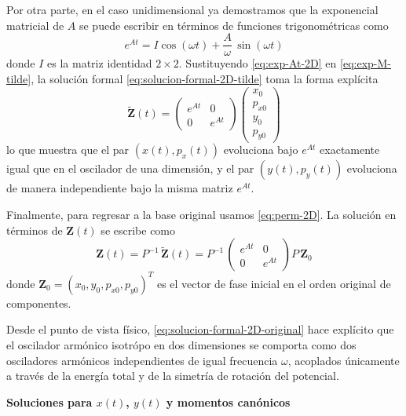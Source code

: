 \documentclass{article}
\begin{document}
Por otra parte, en el caso unidimensional ya demostramos que la exponencial
matricial de $A$ se puede escribir en términos de funciones trigonométricas como
\begin{equation}
e^{At} = I\cos(\omega t) + \frac{A}{\omega}\,\sin(\omega t)
\label{eq:exp-At-2D}
\end{equation}
donde $I$ es la matriz identidad $2\times 2$. Sustituyendo
\eqref{eq:exp-At-2D} en \eqref{eq:exp-M-tilde}, la solución formal
\eqref{eq:solucion-formal-2D-tilde} toma la forma explícita
\begin{equation}
\widetilde{\mathbf{Z}}(t)
=
\begin{pmatrix}
e^{At} & 0 \\[4pt]
0      & e^{At}
\end{pmatrix}
\begin{pmatrix}
x_{0}   \\[2pt]
p_{x0}  \\[2pt]
y_{0}   \\[2pt]
p_{y0}
\end{pmatrix}
\label{eq:solucion-formal-2D-tilde-2}
\end{equation}
lo que muestra que el par $(x(t),p_{x}(t))$ evoluciona bajo $e^{At}$ exactamente
igual que en el oscilador de una dimensión, y el par $(y(t),p_{y}(t))$ evoluciona
de manera independiente bajo la misma matriz $e^{At}$.

Finalmente, para regresar a la base original usamos \eqref{eq:perm-2D}. La
solución en términos de $\mathbf{Z}(t)$ se escribe como
\begin{equation}
\mathbf{Z}(t)
=
P^{-1}\,\widetilde{\mathbf{Z}}(t)
=
P^{-1}\,
\begin{pmatrix}
e^{At} & 0 \\[4pt]
0      & e^{At}
\end{pmatrix}
P\,\mathbf{Z}_{0}
\label{eq:solucion-formal-2D-original}
\end{equation}
donde $\mathbf{Z}_{0} = (x_{0},y_{0},p_{x0},p_{y0})^{T}$ es el vector de fase
inicial en el orden original de componentes.

Desde el punto de vista físico, \eqref{eq:solucion-formal-2D-original} hace
explícito que el oscilador armónico isotrópo en dos dimensiones se comporta
como dos osciladores armónicos independientes de igual frecuencia $\omega$,
acoplados únicamente a través de la energía total y de la simetría de rotación
del potencial.

\bigskip
\textcolor{trueblue}{\textbf{Soluciones para $x(t)$, $y(t)$ y momentos canónicos}}
\end{document}
